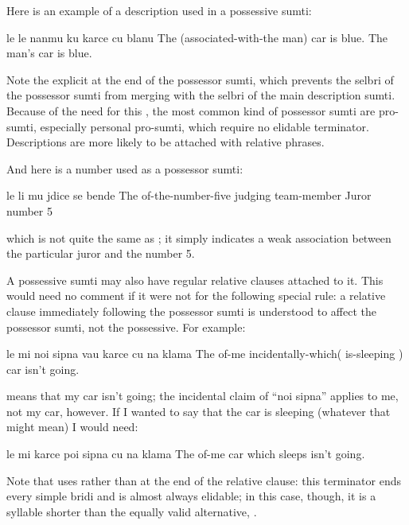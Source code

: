 Here is an example of a description used in a possessive
    sumti:
\begin{example}
le le nanmu ku karce cu blanu\n
The (associated-with-the man) car is blue.\n
The man's car is blue.

Note the explicit  at the end of the possessor sumti,
which prevents the selbri of the possessor sumti from merging
with the selbri of the main description sumti.  Because of the
need for this , the most common kind of possessor sumti
are pro-sumti, especially personal pro-sumti, which require no
elidable terminator.  Descriptions are more likely to be attached
with relative phrases.
\end{example}

And here is a number used as a possessor sumti:
\begin{example}
le li mu jdice se bende\n
The of-the-number-five judging team-member\n
Juror number 5
\end{example}

{\noindent}which is not quite the same as ; it simply
    indicates a weak association between the particular juror and
    the number 5. 

A possessive sumti may also have regular relative clauses
    attached to it. This would need no comment if it were not for
    the following special rule: a relative clause immediately
    following the possessor sumti is understood to affect the
    possessor sumti, not the possessive. For example:
\begin{example}
le mi noi sipna vau karce\n
\T	cu na klama\n
The of-me incidentally-which( is-sleeping ) car\n
\T	isn't going.
\end{example}

{\noindent}means that my car isn't going; the incidental claim of ``noi
    sipna'' applies to me, not my car, however. If I wanted to say
    that the car is sleeping (whatever that might mean) I would
    need:
\begin{example}
le mi karce poi sipna cu na klama\n
The of-me car which sleeps isn't going.
\end{example}

Note that  uses  rather
    than  at the end of the relative clause: this
    terminator ends every simple bridi and is almost always
    elidable; in this case, though, it is a syllable shorter than
    the equally valid alternative, .




